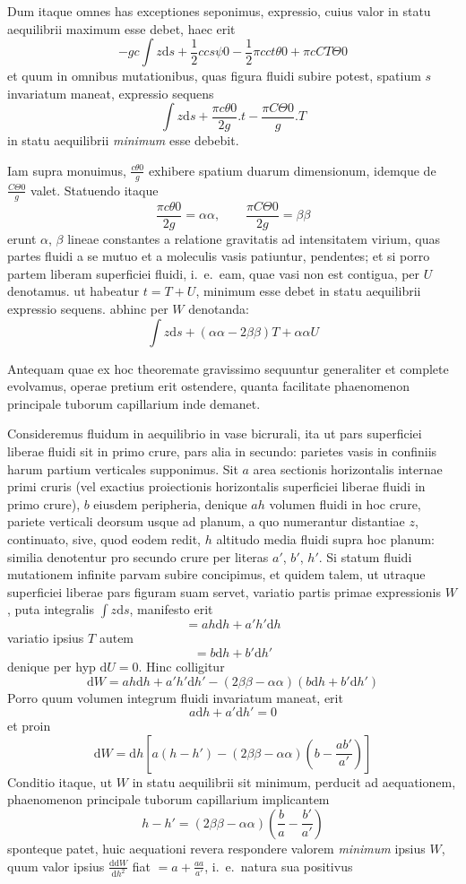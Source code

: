 Dum itaque omnes has exceptiones seponimus, expressio, cuius valor in statu aequilibrii maximum esse debet, haec erit
\[
-gc\int z\mathrm{d}s+\frac12ccs\psi0-\frac12\pi cct\theta0+\pi cCT\Theta0
\]
et quum in omnibus mutationibus, quas figura fluidi subire potest, spatium $s$ invariatum maneat, expressio sequens
\[
\int z\mathrm{d}s+\frac{\pi c\theta0}{2g}.t-\frac{\pi C\Theta0}{g}.T
\]
in statu aequilibrii \textit{minimum} esse debebit.

Iam supra monuimus, $\frac{c\theta0}{g}$ exhibere spatium duarum dimensionum, idemque de $\frac{C\Theta0}{g}$ valet. Statuendo itaque
\[
\frac{\pi c\theta0}{2g}=\alpha\alpha,\qquad\frac{\pi C\Theta0}{2g}=\beta\beta
\]
erunt $\alpha$, $\beta$ lineae constantes a relatione gravitatis ad intensitatem virium, quas partes fluidi a se mutuo et a moleculis vasis patiuntur, pendentes; et si porro partem liberam superficiei fluidi, i.\ e.\ eam, quae vasi non est contigua, per $U$ denotamus. ut habeatur $t=T+U$, minimum esse debet in statu aequilibrii expressio sequens. abhinc per $W$ denotanda:
\[
\int z\mathrm{d}s+(\alpha\alpha-2\beta\beta)T+\alpha\alpha U
\]

Antequam quae ex hoc theoremate gravissimo sequuntur generaliter et complete evolvamus, operae pretium erit ostendere, quanta facilitate phaenomenon principale tuborum capillarium inde demanet.

Consideremus fluidum in aequilibrio in vase bicrurali, ita ut pars superficiei liberae fluidi sit in primo crure, pars alia in secundo: parietes vasis in confiniis harum partium verticales supponimus. Sit $a$ area sectionis horizontalis internae primi cruris (vel exactius proiectionis horizontalis superficiei liberae fluidi in primo crure), $b$ eiusdem peripheria, denique $ah$ volumen fluidi in hoc crure, pariete verticali deorsum usque ad planum, a quo numerantur distantiae $z$, continuato, sive, quod eodem redit, $h$ altitudo media fluidi supra hoc planum: similia denotentur pro secundo crure per literas $a'$, $b'$, $h'$. Si statum fluidi mutationem infinite parvam subire concipimus, et quidem talem, ut utraque superficiei liberae pars figuram suam servet, variatio partis primae expressionis $W$, puta integralis $\int z\mathrm{d}s$, manifesto erit
\[
=ah\mathrm{d}h+a'h'\mathrm{d}h
\]
variatio ipsius $T$ autem
\[
=b\mathrm{d}h+b'\mathrm{d}h'
\]
denique per hyp $\mathrm{d}U=0$. Hinc colligitur
\[
\mathrm{d}W=ah\mathrm{d}h+a'h'\mathrm{d}h'-(2\beta\beta-\alpha\alpha)(b\mathrm{d}h+b'\mathrm{d}h')
\]
Porro quum volumen integrum fluidi invariatum maneat, erit
\[
a\mathrm{d}h+a'\mathrm{d}h'=0
\]
et proin
\[
\mathrm{d}W=\mathrm{d}h[a(h-h')-(2\beta\beta-\alpha\alpha)(b-\frac{ab'}{a'})]
\]
Conditio itaque, ut $W$ in statu aequilibrii sit minimum, perducit ad aequationem, phaenomenon principale tuborum capillarium implicantem
\[
h-h'=(2\beta\beta-\alpha\alpha)(\frac{b}{a}-\frac{b'}{a'})
\]
sponteque patet, huic aequationi revera respondere valorem \textit{minimum} ipsius $W$, quum valor ipsius $\frac{\mathrm{d}\mathrm{d}W}{\mathrm{d}h^2}$ fiat $=a+\frac{aa}{a'}$, i.\ e.\ natura sua positivus

